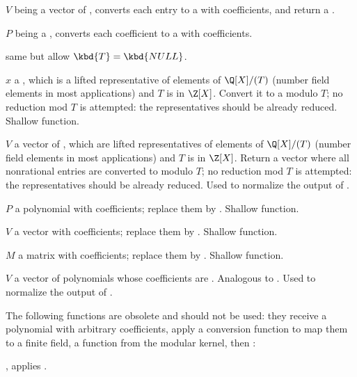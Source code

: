  $V$ being a vector of ,
converts each entry to a  with  coefficients, and return
a .

$P$ being a , converts each coefficient to a  with
 coefficients.

 same but allow
$\kbd{T} = \kbd{NULL}$.



 $x$ a , which is
a lifted representative of elements of $\Q[X]/(T)$ (number field elements
in most applications) and $T$ is in $\Z[X]$. Convert it to a 
modulo $T$; no reduction mod $T$ is attempted: the representatives should be
already reduced. Shallow function.

 $V$ a vector of , which
are lifted representatives of elements of $\Q[X]/(T)$ (number field elements
in most applications) and $T$ is in $\Z[X]$. Return a vector where all
nonrational entries are converted to  modulo $T$; no reduction
mod $T$ is attempted: the representatives should be already reduced. Used to
normalize the output of .

 $P$ a polynomial with 
coefficients; replace them by . Shallow function.

 $V$ a vector with 
coefficients; replace them by . Shallow function.

 $M$ a matrix with 
coefficients; replace them by . Shallow function.

 $V$ a vector of polynomials whose
coefficients are . Analogous to .
Used to normalize the output of .

The following functions are obsolete and should not be used: they receive a
polynomial with arbitrary coefficients, apply a conversion function to map
them to a finite field, a function from the modular kernel, then
:

, applies .

